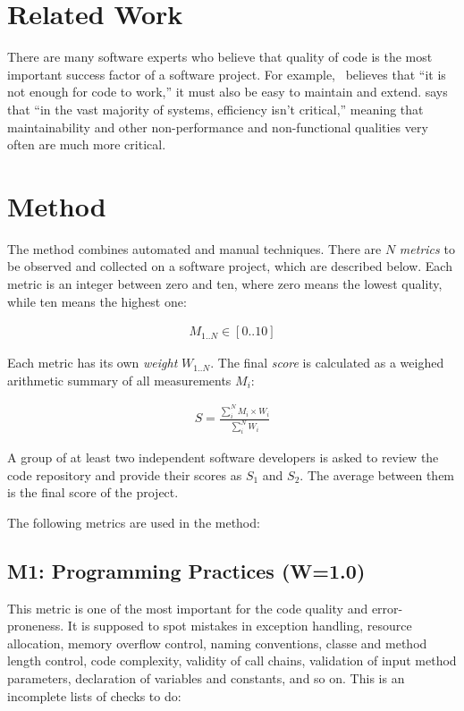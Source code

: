 \documentclass[12pt,oneside]{article}
\begin{document}
\section{Related Work}
\label{sec:related}

There are many software experts who believe that quality of code is the
most important success factor of a software project.
For example,~\citet{martin2009clean} believes that ``it is not enough for code to work,''
it must also be easy to maintain and extend.
\citet{mcconnell2004code} says that ``in the vast majority of systems, efficiency isn't critical,''
meaning that maintainability and other non-performance and non-functional
qualities very often are much more critical.

\section{Method}
\label{sec:method}

The method combines automated and manual techniques. There are $N$
\emph{metrics} to be observed and collected on a software project, which are described
below. Each metric is an integer between zero and ten, where
zero means the lowest quality, while ten means the highest one:

\begin{eqnarray}
M_{1..N} \in [ 0 .. 10 ]
\end{eqnarray}

Each metric has its own \emph{weight} $W_{1..N}$.
The final \emph{score} is calculated
as a weighed arithmetic summary of all measurements $M_i$:

\begin{align}
S = \frac{\sum_i^N M_i \times W_i}{\sum_i^N W_i}
\end{align}

A group of at least two independent software developers is asked to review the code
repository and provide their scores as $S_1$ and $S_2$. The average between
them is the final score of the project.

The following metrics are used in the method:

\subsection{M1: Programming Practices (W=1.0)}

This metric is one of the most important for the code quality and error-proneness.
It is supposed to spot mistakes in exception handling, resource allocation, memory overflow control,
naming conventions, classe and method length control, code complexity,
validity of call chains, validation of input method parameters,
declaration of variables and constants,
and so on. This is an incomplete lists of checks to do:
\end{document}
